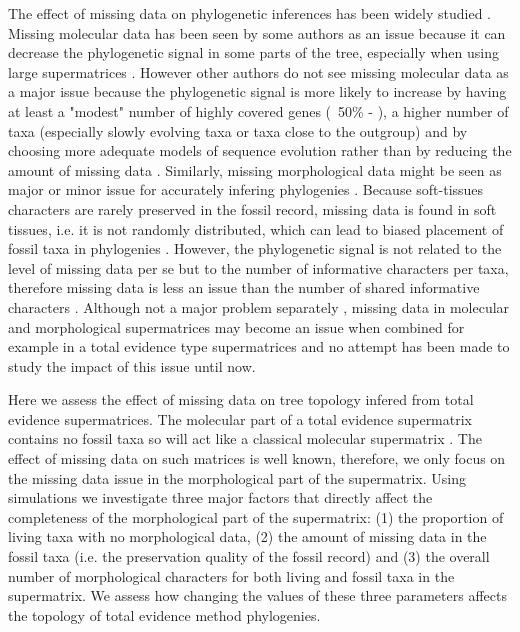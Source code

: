 \documentclass[12pt,letterpaper]{article}
\begin{document}
The effect of missing data on phylogenetic inferences has been widely studied \citep{wiensmissing2003,wiensmissing2006,wiensmissing2008,lemmonthe2009,rouresite-specific2011,sansomfossilization2013}. Missing molecular data has been seen by some authors as an issue because it can decrease the phylogenetic signal in some parts of the tree, especially when using large supermatrices \citep{lemmonthe2009}. However other authors do not see missing molecular data as a major issue because the phylogenetic signal is more likely to increase by having at least a 
"modest" %
number of highly covered genes (~50\% - \citet{rouresite-specific2011}), a higher number of taxa (especially slowly evolving taxa or taxa close to the outgroup) and by choosing more adequate models of sequence evolution rather than by reducing the amount of missing data \citep{wiensmissing2006,wiensmissing2008,rouresite-specific2011}. Similarly, missing morphological data might be seen as major or minor issue for accurately infering phylogenies \citep{wiensmissing2003,sansomfossilization2013}. Because soft-tissues characters are rarely preserved in the fossil record, missing data is found in soft tissues, i.e. it is not randomly distributed, which can lead to biased placement of fossil taxa in phylogenies \citep{sansomfossilization2013}. However, the phylogenetic signal is not related to the level of missing data per se but to the number of informative characters per taxa, therefore missing data is less an issue than the number of shared informative characters \citep{wiensmissing2003}.
Although not a major problem separately \citep{wiensmissing2003,wiensmissing2006,wiensmissing2008,rouresite-specific2011}, missing data in molecular and morphological supermatrices may become an issue when combined for example in a total evidence type supermatrices and no attempt has been made to study the impact of this issue until now. %

Here we assess the effect of missing data on tree topology infered from total evidence supermatrices. The molecular part of a total evidence supermatrix contains no fossil taxa so will act like a classical molecular supermatrix \citep{ronquista2012}. The effect of missing data on such matrices is well known, therefore, we only focus on the missing data issue in the morphological part of the supermatrix. Using simulations we investigate three major factors that directly affect the completeness of the morphological part of the supermatrix: (1) the proportion of living taxa with no morphological data, (2) the amount of missing data in the fossil taxa (i.e. the preservation quality of the fossil record) and (3) the overall number of morphological characters for both living and fossil taxa in the supermatrix. We assess how changing the values of these three parameters affects the topology of total evidence method phylogenies.
\end{document}
